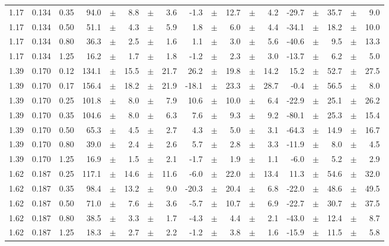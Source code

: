 \documentclass[prc,aps,floatfix,showpacs,showkeys,twocolumn,superscriptaddress,letterpaper,10pt]{revtex4-1}
\begin{document}
\begin{widetext}
\begin{longtable}{ccc@{\extracolsep{1cm}}d@{\extracolsep{0pt}}cdcd@{\extracolsep{1cm}}d@{\extracolsep{0pt}}cdcd@{\extracolsep{1cm}}d@{\extracolsep{0pt}}cdcd}
1.17 & 0.134 & 0.35 & 94.0 &	$\pm$ & 8.8 &	$\pm$ & 3.6 & -1.3 &	$\pm$ & 12.7 &	$\pm$ & 4.2 & -29.7 &	$\pm$ & 35.7 &	$\pm$ & 9.0\\
1.17 & 0.134 & 0.50 & 51.1 &	$\pm$ & 4.3 &	$\pm$ & 5.9 & 1.8 &	$\pm$ & 6.0 &	$\pm$ & 4.4 & -34.1 &	$\pm$ & 18.2 &	$\pm$ & 10.0\\
1.17 & 0.134 & 0.80 & 36.3 &	$\pm$ & 2.5 &	$\pm$ & 1.6 & 1.1 &	$\pm$ & 3.0 &	$\pm$ & 5.6 & -40.6 &	$\pm$ & 9.5 &	$\pm$ & 13.3\\
1.17 & 0.134 & 1.25 & 16.2 &	$\pm$ & 1.7 &	$\pm$ & 1.8 & -1.2 &	$\pm$ & 2.3 &	$\pm$ & 3.0 & -13.7 &	$\pm$ & 6.2 &	$\pm$ & 5.0\\
1.39 & 0.170 & 0.12 & 134.1 &	$\pm$ & 15.5 &	$\pm$ & 21.7 & 26.2 &	$\pm$ & 19.8 &	$\pm$ & 14.2 & 15.2 &	$\pm$ & 52.7 &	$\pm$ & 27.5\\
1.39 & 0.170 & 0.17 & 156.4 &	$\pm$ & 18.2 &	$\pm$ & 21.9 & -18.1 &	$\pm$ & 23.3 &	$\pm$ & 28.7 & -0.4 &	$\pm$ & 56.5 &	$\pm$ & 8.0\\
1.39 & 0.170 & 0.25 & 101.8 &	$\pm$ & 8.0 &	$\pm$ & 7.9 & 10.6 &	$\pm$ & 10.0 &	$\pm$ & 6.4 & -22.9 &	$\pm$ & 25.1 &	$\pm$ & 26.2\\
1.39 & 0.170 & 0.35 & 104.6 &	$\pm$ & 8.0 &	$\pm$ & 6.3 & 7.6 &	$\pm$ & 9.3 &	$\pm$ & 9.2 & -80.1 &	$\pm$ & 25.3 &	$\pm$ & 15.4\\
1.39 & 0.170 & 0.50 & 65.3 &	$\pm$ & 4.5 &	$\pm$ & 2.7 & 4.3 &	$\pm$ & 5.0 &	$\pm$ & 3.1 & -64.3 &	$\pm$ & 14.9 &	$\pm$ & 16.7\\
1.39 & 0.170 & 0.80 & 39.0 &	$\pm$ & 2.4 &	$\pm$ & 2.6 & 5.7 &	$\pm$ & 2.8 &	$\pm$ & 3.3 & -11.9 &	$\pm$ & 8.0 &	$\pm$ & 4.5\\
1.39 & 0.170 & 1.25 & 16.9 &	$\pm$ & 1.5 &	$\pm$ & 2.1 & -1.7 &	$\pm$ & 1.9 &	$\pm$ & 1.1 & -6.0 &	$\pm$ & 5.2 &	$\pm$ & 2.9\\
1.62 & 0.187 & 0.25 & 117.1 &	$\pm$ & 14.6 &	$\pm$ & 11.6 & -6.0 &	$\pm$ & 22.0 &	$\pm$ & 13.4 & 11.3 &	$\pm$ & 54.6 &	$\pm$ & 32.0\\
1.62 & 0.187 & 0.35 & 98.4 &	$\pm$ & 13.2 &	$\pm$ & 9.0 & -20.3 &	$\pm$ & 20.4 &	$\pm$ & 6.8 & -22.0 &	$\pm$ & 48.6 &	$\pm$ & 49.5\\
1.62 & 0.187 & 0.50 & 71.0 &	$\pm$ & 7.6 &	$\pm$ & 3.6 & -5.7 &	$\pm$ & 10.7 &	$\pm$ & 6.9 & -22.7 &	$\pm$ & 30.7 &	$\pm$ & 37.5\\
1.62 & 0.187 & 0.80 & 38.5 &	$\pm$ & 3.3 &	$\pm$ & 1.7 & -4.3 &	$\pm$ & 4.4 &	$\pm$ & 2.1 & -43.0 &	$\pm$ & 12.4 &	$\pm$ & 8.7\\
1.62 & 0.187 & 1.25 & 18.3 &	$\pm$ & 2.7 &	$\pm$ & 2.2 & -1.2 &	$\pm$ & 3.8 &	$\pm$ & 1.6 & -15.9 &	$\pm$ & 11.5 &	$\pm$ & 5.8\\

\end{longtable}
\end{widetext}
\end{document}
